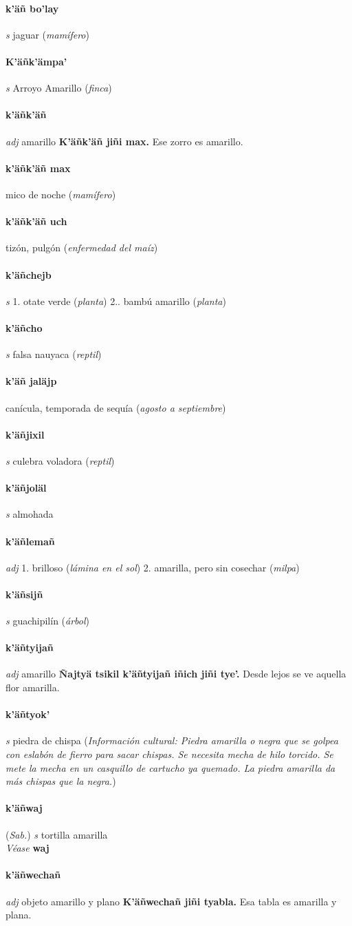 \documentclass{scrbook}
\newcommand{\entry}[1]{\paragraph{#1}}
\newcommand{\onedefinition}[1]{#1.}
\newcommand{\partofspeech}[1]{\textit{#1}}
\newcommand{\spanishtranslation}[1]{#1}
\newcommand{\clarification}[1]{(\textit{#1})}
\newcommand{\cholexample}[1]{\textbf{#1}}
\newcommand{\exampletranslation}[1]{#1}
\newcommand{\alsosee}[1]{\\\textit{Véase} \textbf{#1}}
\newcommand{\relevantdialect}[1]{(\textit{#1})}
\newcommand{\culturalinformation}[1]{(\textit{#1})}
\begin{document}
\begin{multicols}{2}
\entry{k'äñ bo'lay}
\partofspeech{s}
\spanishtranslation{jaguar}
\clarification{mamífero}

\entry{K'äñk'ämpa'}
\partofspeech{s}
\spanishtranslation{Arroyo Amarillo}
\clarification{finca}

\entry{k'äñk'äñ}
\partofspeech{adj}
\spanishtranslation{amarillo}
\cholexample{K'äñk'äñ jiñi max.}
\exampletranslation{Ese zorro es amarillo.}

\entry{k'äñk'äñ max}
\spanishtranslation{mico de noche}
\clarification{mamífero}

\entry{k'äñk'äñ uch}
\spanishtranslation{tizón, pulgón}
\clarification{enfermedad del maíz}

\entry{k'äñchejb}
\partofspeech{s}
\onedefinition{1}
\spanishtranslation{otate verde}
\clarification{planta}
\onedefinition{2.}
\spanishtranslation{bambú amarillo}
\clarification{planta}

\entry{k'äñcho}
\partofspeech{s}
\spanishtranslation{falsa nauyaca}
\clarification{reptil}

\entry{k'äñ jaläjp}
\spanishtranslation{canícula, temporada de sequía}
\clarification{agosto a septiembre}

\entry{k'äñjixil}
\partofspeech{s}
\spanishtranslation{culebra voladora}
\clarification{reptil}

\entry{k'äñjoläl}
\partofspeech{s}
\spanishtranslation{almohada}

\entry{k'äñlemañ}
\partofspeech{adj}
\onedefinition{1}
\spanishtranslation{brilloso}
\clarification{lámina en el sol}
\onedefinition{2}
\spanishtranslation{amarilla, pero sin cosechar}
\clarification{milpa}

\entry{k'äñsijñ}
\partofspeech{s}
\spanishtranslation{guachipilín}
\clarification{árbol}

\entry{k'äñtyijañ}
\partofspeech{adj}
\spanishtranslation{amarillo}
\cholexample{Ñajtyä tsikil k'äñtyijañ iñich jiñi tye'.}
\exampletranslation{Desde lejos se ve aquella flor amarilla.}

\entry{k'äñtyok'}
\partofspeech{s}
\spanishtranslation{piedra de chispa}
\culturalinformation{Información cultural: Piedra amarilla o negra que se golpea con eslabón de fierro para sacar chispas. Se necesita mecha de hilo torcido. Se mete la mecha en un casquillo de cartucho ya quemado. La piedra amarilla da más chispas que la negra.}

\entry{k'äñwaj}
\relevantdialect{Sab.}
\partofspeech{s}
\spanishtranslation{tortilla amarilla}
\alsosee{waj}

\entry{k'äñwechañ}
\partofspeech{adj}
\spanishtranslation{objeto amarillo y plano}
\cholexample{K'äñwechañ jiñi tyabla.}
\exampletranslation{Esa tabla es amarilla y plana.}


\end{multicols}
\end{document}
